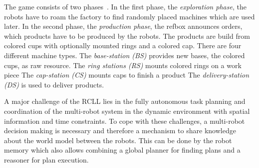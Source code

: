 \documentclass[a4paper,11pt]{article}
\newcommand{\reffig}[1]{Figure~\ref{#1}}
\begin{document}
The game consists of two phases~\cite{LLSF-Rules-2015}. In the first
phase, the \emph{exploration phase}, the robots have to roam the
factory to find randomly placed machines which are used later.
%
In the second phase, the \emph{production phase}, the refbox announces
orders, which products have to be produced by the robots. The products
are build from colored cups with optionally mounted rings and a
colored cap.
There are four different machine
types. The \emph{base-station (BS)} provides new bases, the colored
cups, as raw resource. The \emph{ring stations (RS)} mounts colored
rings on a work piece
The \emph{cap-station (CS)} mounts %
caps to finish a product
The \emph{delivery-station (DS)} is used to deliver products.

A major challenge of the RCLL lies in the fully autonomous task
planning and coordination of the multi-robot system in the dynamic
environment with spatial information and time constraints.
To cope with these challenges, a
multi-robot decision making is necessary and therefore a mechanism to
share knowledge about the world model between the robots. This can be
done by the robot memory which also allows combining a global planner
for finding plans and a reasoner for plan execution.
\end{document}
